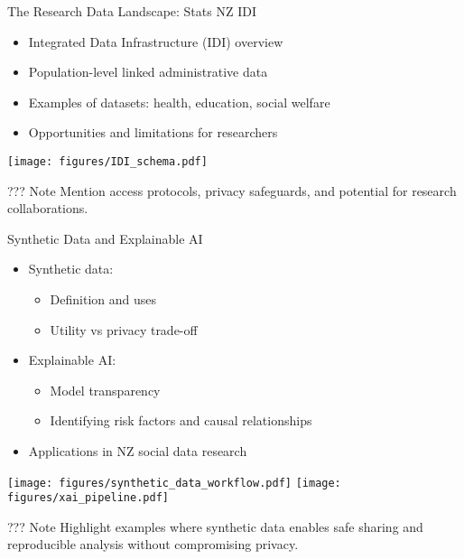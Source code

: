 \documentclass[
  12pt,
  ignorenonframetext,
]{beamer}
\providecommand{\tightlist}{%
  \setlength{\itemsep}{0pt}\setlength{\parskip}{0pt}}\usepackage{longtable,booktabs,array}
\begin{document}
\begin{frame}{The Research Data Landscape: Stats NZ IDI}
\label{the-research-data-landscape-stats-nz-idi}
\begin{itemize}
\tightlist
\item
  Integrated Data Infrastructure (IDI) overview
\item
  Population-level linked administrative data
\item
  Examples of datasets: health, education, social welfare
\item
  Opportunities and limitations for researchers
\end{itemize}

\texttt{[image: figures/IDI\_schema.pdf]}

??? Note Mention access protocols, privacy safeguards, and potential for
research collaborations.
\end{frame}

\begin{frame}{Synthetic Data and Explainable AI}
\label{synthetic-data-and-explainable-ai}
\begin{itemize}
\tightlist
\item
  Synthetic data:

  \begin{itemize}
  \tightlist
  \item
    Definition and uses
  \item
    Utility vs privacy trade-off
  \end{itemize}
\item
  Explainable AI:

  \begin{itemize}
  \tightlist
  \item
    Model transparency
  \item
    Identifying risk factors and causal relationships
  \end{itemize}
\item
  Applications in NZ social data research
\end{itemize}

\texttt{[image: figures/synthetic\_data\_workflow.pdf]}
\texttt{[image: figures/xai\_pipeline.pdf]}

??? Note Highlight examples where synthetic data enables safe sharing
and reproducible analysis without compromising privacy.
\end{frame}
\end{document}
